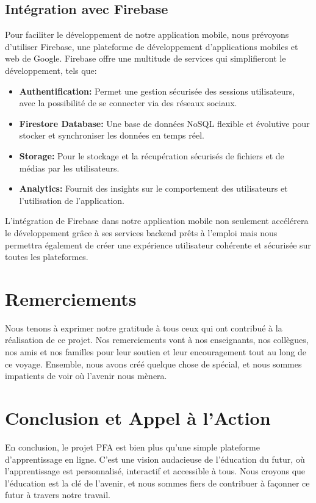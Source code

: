 \subsection{Intégration avec Firebase}
Pour faciliter le développement de notre application mobile, nous prévoyons d'utiliser Firebase, une plateforme de développement d'applications mobiles et web de Google. Firebase offre une multitude de services qui simplifieront le développement, tels que:

\begin{itemize}
    \item \textbf{Authentification:} Permet une gestion sécurisée des sessions utilisateurs, avec la possibilité de se connecter via des réseaux sociaux.
    \item \textbf{Firestore Database:} Une base de données NoSQL flexible et évolutive pour stocker et synchroniser les données en temps réel.
    \item \textbf{Storage:} Pour le stockage et la récupération sécurisés de fichiers et de médias par les utilisateurs.
    \item \textbf{Analytics:} Fournit des insights sur le comportement des utilisateurs et l'utilisation de l'application.
\end{itemize}

L'intégration de Firebase dans notre application mobile non seulement accélérera le développement grâce à ses services backend prêts à l'emploi mais nous permettra également de créer une expérience utilisateur cohérente et sécurisée sur toutes les plateformes.

\section{Remerciements}

Nous tenons à exprimer notre gratitude à tous ceux qui ont contribué à la réalisation de ce projet.  Nos remerciements vont à nos enseignants, nos collègues, nos amis et nos familles pour leur soutien et leur encouragement tout au long de ce voyage.  Ensemble, nous avons créé quelque chose de spécial, et nous sommes impatients de voir où l'avenir nous mènera.

\section{Conclusion et Appel à l'Action}

En conclusion, le projet \gls{PFA} est bien plus qu'une simple plateforme d'apprentissage en ligne. C'est une vision audacieuse de l'éducation du futur, où l'apprentissage est personnalisé, interactif et accessible à tous. Nous croyons que l'éducation est la clé de l'avenir, et nous sommes fiers de contribuer à façonner ce futur à travers notre travail.

